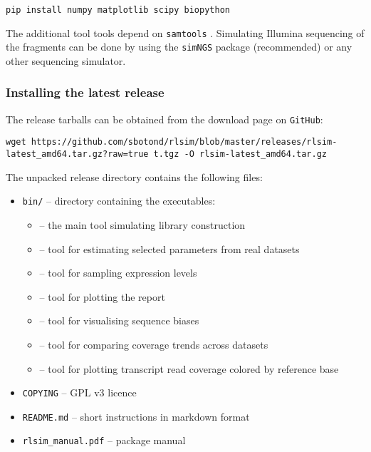 \begin{verbatim}
pip install numpy matplotlib scipy biopython
\end{verbatim}

The additional tool \plotCov tools depend on {\tt samtools} \cite{samtools}.
Simulating Illumina sequencing of the fragments can be done by using the {\tt simNGS} package \cite{simngs} (recommended) or any other sequencing simulator.

\subsubsection{Installing the latest release}
\label{sss:release_inst}

The release tarballs can be obtained from the \rlsim download \cite{rlsim_down} page on \texttt{GitHub}:

\begin{verbatim}
wget https://github.com/sbotond/rlsim/blob/master/releases/rlsim-latest_amd64.tar.gz?raw=true t.tgz -O rlsim-latest_amd64.tar.gz
\end{verbatim}

The unpacked release directory contains the following files:

\begin{itemize}
    \item{{\tt bin/} -- directory containing the executables:
        \begin{itemize}
            \item[]{\rlsim -- the main tool simulating library construction}
            \item[]{\effest -- tool for estimating selected parameters from real datasets}
            \item[]{\sel -- tool for sampling expression levels}
            \item[]{\plotRlsim -- tool for plotting the \rlsim report}
            \item[]{\pbPlot -- tool for visualising sequence biases}
            \item[]{\covCmp -- tool for comparing coverage trends across datasets}
            \item[]{\plotCov -- tool for plotting transcript read coverage colored by reference base}
        \end{itemize}
    }
    \item {\tt COPYING} -- GPL v3 licence
    \item {\tt README.md} -- short instructions in markdown format
    \item {\tt rlsim\_manual.pdf} -- package manual
\end{itemize}

